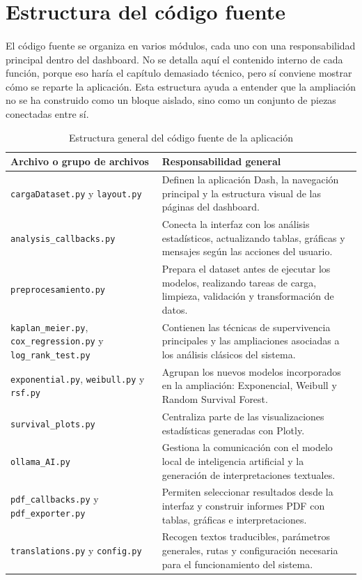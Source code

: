\section{Estructura del código fuente}

\paragraph*{}
El código fuente se organiza en varios módulos, cada uno con una responsabilidad principal dentro del dashboard. No se detalla aquí el contenido interno de cada función, porque eso haría el capítulo demasiado técnico, pero sí conviene mostrar cómo se reparte la aplicación. Esta estructura ayuda a entender que la ampliación no se ha construido como un bloque aislado, sino como un conjunto de piezas conectadas entre sí.

\begin{table}[H]
\centering
\small
\begin{tabularx}{\textwidth}{|p{}|X|}
\hline
\textbf{Archivo o grupo de archivos} & \textbf{Responsabilidad general} \\ \hline
\texttt{cargaDataset.py} y \texttt{layout.py} & Definen la aplicación Dash, la navegación principal y la estructura visual de las páginas del dashboard. \\ \hline
\texttt{analysis\_callbacks.py} & Conecta la interfaz con los análisis estadísticos, actualizando tablas, gráficas y mensajes según las acciones del usuario. \\ \hline
\texttt{preprocesamiento.py} & Prepara el dataset antes de ejecutar los modelos, realizando tareas de carga, limpieza, validación y transformación de datos. \\ \hline
\texttt{kaplan\_meier.py}, \texttt{cox\_regression.py} y \texttt{log\_rank\_test.py} & Contienen las técnicas de supervivencia principales y las ampliaciones asociadas a los análisis clásicos del sistema. \\ \hline
\texttt{exponential.py}, \texttt{weibull.py} y \texttt{rsf.py} & Agrupan los nuevos modelos incorporados en la ampliación: Exponencial, Weibull y Random Survival Forest. \\ \hline
\texttt{survival\_plots.py} & Centraliza parte de las visualizaciones estadísticas generadas con Plotly. \\ \hline
\texttt{ollama\_AI.py} & Gestiona la comunicación con el modelo local de inteligencia artificial y la generación de interpretaciones textuales. \\ \hline
\texttt{pdf\_callbacks.py} y \texttt{pdf\_exporter.py} & Permiten seleccionar resultados desde la interfaz y construir informes PDF con tablas, gráficas e interpretaciones. \\ \hline
\texttt{translations.py} y \texttt{config.py} & Recogen textos traducibles, parámetros generales, rutas y configuración necesaria para el funcionamiento del sistema. \\ \hline
\end{tabularx}
\caption{Estructura general del código fuente de la aplicación}
\label{tab:estructura_codigo}
\normalsize
\end{table}

